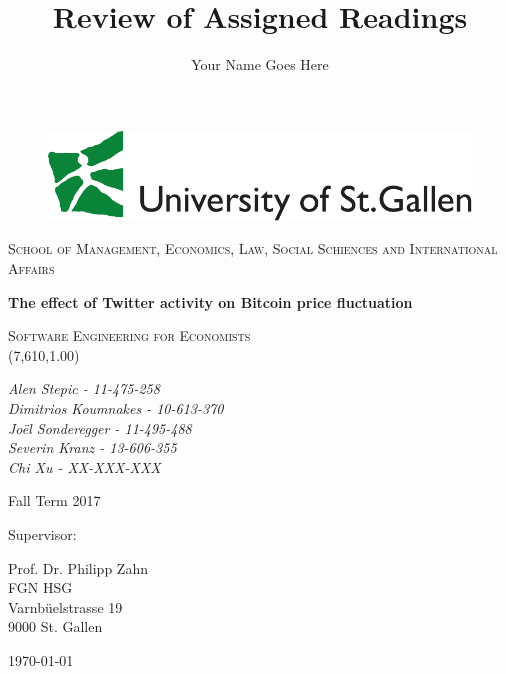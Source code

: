 \documentclass[a4paper,american,12pt]{article}
\title{Review of Assigned Readings}
\author{Your Name Goes Here}
\begin{document}
    \begin{titlepage}
      	\begin{figure}
      	\centering
        \includegraphics[scale=0.35]{logohsg}
        \end{figure}    
    \centering
    {\scshape\large School of Management, Economics, Law, Social Schiences and International Affairs \par}
    \vspace{2.0cm}
    {\huge\bfseries The effect of Twitter activity on Bitcoin price fluctuation  \par}
	\vspace{2.0cm}
    {\scshape\Large Software Engineering for Economists \\(7,610,1.00) \par}
    \vspace{2.0cm}
    {\itshape\large Alen Stepic - 11-475-258 \\Dimitrios Koumnakes - 10-613-370 \\Joël Sonderegger - 11-495-488 \\Severin Kranz - 13-606-355 \\Chi Xu - XX-XXX-XXX \par}
    	\begin{spacing}{1}
    	\vspace{1.2cm}
    	{Fall Term 2017 \par}
    	\vspace{1.2cm}
    	Supervisor:\\
    	{Prof. Dr. Philipp Zahn\\ FGN HSG\\ Varnbüelstrasse 19\\ 9000 St. Gallen \par} 
    	\end{spacing}
	\vfill
	{\large \today\par}
    \end{titlepage}
    
\clearpage
    
\end{document}

